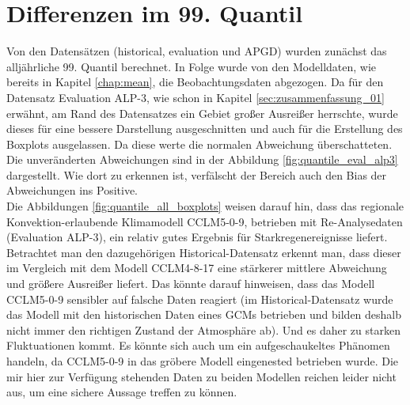 \section{Differenzen im 99. Quantil} \label{sec:diff_q99}
Von den Datensätzen (historical, evaluation und APGD) wurden zunächst das alljährliche 99. Quantil berechnet. In Folge wurde von den Modelldaten, wie bereits in Kapitel \ref{chap:mean}, die Beobachtungsdaten abgezogen. Da für den Datensatz Evaluation ALP-3, wie schon in Kapitel \ref{sec:zusammenfassung_01} erwähnt, am Rand des Datensatzes ein Gebiet großer Ausreißer herrschte, wurde dieses für eine bessere Darstellung ausgeschnitten und auch für die Erstellung des Boxplots ausgelassen. Da diese werte die normalen Abweichung überschatteten. Die unveränderten Abweichungen sind in der Abbildung \ref{fig:quantile_eval_alp3} dargestellt. Wie dort zu erkennen ist, verfälscht der Bereich auch den Bias der Abweichungen ins Positive.\\
Die Abbildungen \ref{fig:quantile_all_boxplots} weisen darauf hin, dass das regionale Konvektion-erlaubende Klimamodell CCLM5-0-9, betrieben mit Re-Analysedaten (Evaluation ALP-3), ein relativ gutes Ergebnis für Starkregenereignisse liefert. Betrachtet man den dazugehörigen Historical-Datensatz erkennt man, dass dieser im Vergleich mit dem Modell CCLM4-8-17 eine stärkerer mittlere Abweichung und größere Ausreißer liefert. Das könnte darauf hinweisen, dass das Modell CCLM5-0-9 sensibler auf falsche Daten reagiert (im Historical-Datensatz wurde das Modell mit den historischen Daten eines GCMs betrieben und bilden deshalb nicht immer den richtigen Zustand der Atmosphäre ab). Und es daher zu starken Fluktuationen kommt. Es könnte sich auch um ein aufgeschaukeltes Phänomen handeln, da CCLM5-0-9 in das gröbere Modell eingenested betrieben wurde. Die mir hier zur Verfügung stehenden Daten zu beiden Modellen reichen leider nicht aus, um eine sichere Aussage treffen zu können.\\

